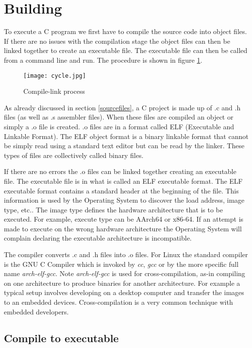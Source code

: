 \section{Building} 

To execute a C program we first have to compile the source code into object files. If there are no issues with the compilation stage the object files can then be linked together to create an executable file. The executable file can then be called from a command line and run. The procedure is shown in figure \ref{compile}. 

\begin{figure}[H]
\centerline{\texttt{[image: cycle.jpg]}}
\caption{Compile-link process}
\label{compile}
\end{figure}

As already discussed in section \ref{sourcefiles}, a C project is made up of .c and .h files (as well as .s assembler files). When these files are compiled an object or simply a .o file is created. .o files are in a format called ELF (Executable and Linkable Format). The ELF object format is a binary linkable format that cannot be simply read using a standard text editor but can be read by the linker. These types of files are collectively called binary files.

 If there are no errors the .o files can be linked together creating an executable file. The executable file is in what is called an ELF executable format. The ELF executable format contains a standard header at the beginning of the file. This information is used by the Operating System to discover the load address, image type, etc.. The image type defines the hardware architecture that is to be executed. For example, execute type can be AArch64 or x86-64. If an attempt is made to execute on the wrong hardware architecture the Operating System will complain declaring the executable architecture is incompatible.
 
The compiler converts .c and .h files into .o files. For Linux the standard compiler is the GNU C Compiler which is invoked by \textit{cc}, \textit{gcc} or by the more specific full name \textit{arch-elf-gcc}. Note \textit{arch-elf-gcc} is used for cross-compilation, as-in compiling on one architecture to produce binaries for another architecture. For example a typical setup involves developing on a desktop computer and transfer the images to an embedded devices. Cross-compilation is a very common technique with embedded developers. 

\subsection{Compile to executable}

